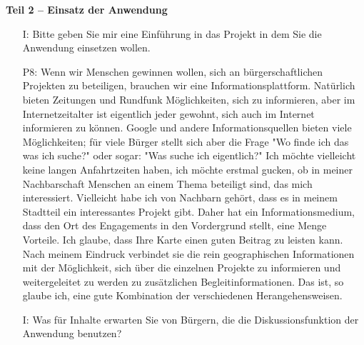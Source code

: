 \textbf{Teil 2 -- Einsatz der Anwendung}
\begin{itemize}
    \item[I:] Bitte geben Sie mir eine Einf{\"u}hrung in das Projekt in dem Sie die Anwendung einsetzen wollen.
    \item[P8:] Wenn wir Menschen gewinnen wollen, sich an b{\"u}rgerschaftlichen Projekten zu beteiligen, brauchen wir eine Informationsplattform. Nat{\"u}rlich bieten Zeitungen und Rundfunk M{\"o}glichkeiten, sich zu informieren, aber im Internetzeitalter ist eigentlich jeder gewohnt, sich auch im Internet informieren zu k{\"o}nnen. Google und andere Informationsquellen bieten viele M{\"o}glichkeiten; f{\"u}r viele B{\"u}rger stellt sich aber die Frage "Wo finde ich das was ich suche?" oder sogar: "Was suche ich eigentlich?" Ich m{\"o}chte vielleicht keine langen Anfahrtzeiten haben, ich m{\"o}chte erstmal gucken, ob in meiner Nachbarschaft Menschen an einem Thema beteiligt sind, das mich interessiert. Vielleicht habe ich von Nachbarn geh{\"o}rt, dass es in meinem Stadtteil ein interessantes Projekt gibt. Daher hat ein Informationsmedium, dass den Ort des Engagements in den Vordergrund stellt, eine Menge Vorteile. Ich glaube, dass Ihre Karte einen guten Beitrag zu leisten kann. Nach meinem Eindruck verbindet sie die rein geographischen Informationen mit der M{\"o}glichkeit, sich {\"u}ber die einzelnen Projekte zu informieren und weitergeleitet zu werden zu zus{\"a}tzlichen Begleitinformationen. Das ist, so glaube ich, eine gute Kombination der verschiedenen Herangehensweisen.
    \item[I:] Was f{\"u}r Inhalte erwarten Sie von B{\"u}rgern, die die Diskussionsfunktion der Anwendung benutzen?

\end{itemize}
